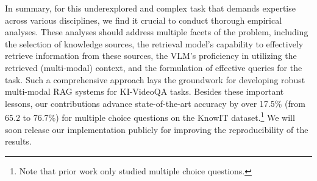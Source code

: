 In summary, for this underexplored and complex task that demands expertise across various disciplines, we find it crucial to conduct thorough empirical analyses. These analyses should address multiple facets of the problem, including the selection of knowledge sources, the retrieval model's capability to effectively retrieve information from these sources, the VLM's proficiency in utilizing the retrieved (multi-modal) context, and the formulation of effective queries for the task. Such a comprehensive approach lays the groundwork for developing robust multi-modal RAG systems for KI-VideoQA tasks. Besides these important lessons, our contributions advance state-of-the-art accuracy by over 17.5\% (from 65.2 to 76.7\%) for multiple choice questions on the KnowIT dataset.\footnote{Note that prior work only studied multiple choice questions.} We will soon release our implementation publicly for improving the reproducibility of the results.

















